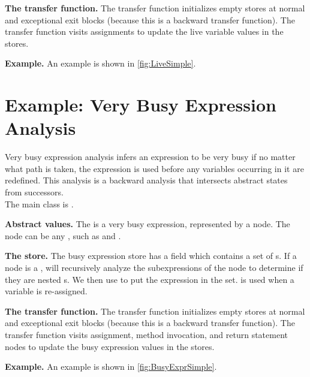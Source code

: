 \textbf{The transfer function.} The transfer function 
initializes empty stores at normal and exceptional exit blocks (because this
is a backward transfer function). The transfer function visits assignments to
update the live variable values in the stores.

\textbf{Example.} An example is shown in \autoref{fig:LiveSimple}.


\section{Example: Very Busy Expression Analysis}

Very busy expression analysis infers an expression to be very busy if no matter what path is taken,
the expression is used before any variables occurring in it are redefined.
This analysis is a backward analysis that intersects abstract states from successors.
\\
The main class is .

\textbf{Abstract values.} The  is a very busy expression, represented by a node.
The node can be any , such as 
and .

\textbf{The store.} The busy expression store  has a field
 which contains a set of s.
If a node is a , 
will recursively analyze the subexpressions of the node to determine
if they are nested s. We then use 
to put the expression in the set.  is used when a variable is re-assigned.

\textbf{The transfer function.} The transfer function 
initializes empty stores at normal and exceptional exit blocks (because this
is a backward transfer function). The transfer function visits assignment, method invocation,
and return statement nodes to update the busy expression values in the stores.

\textbf{Example.} An example is shown in \autoref{fig:BusyExprSimple}.


